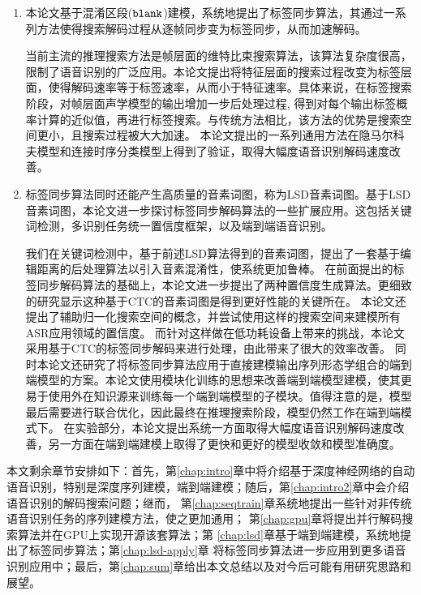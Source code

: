 \begin{enumerate}
\item 本论文基于混淆区段($\tt blank$)建模，系统地提出了标签同步算法，其通过一系列方法使得搜索解码过程从逐帧同步变为标签同步，从而加速解码。

当前主流的推理搜索方法是帧层面的维特比束搜索算法，该算法复杂度很高，限制了语音识别的广泛应用。本论文提出将特征层面的搜索过程改变为标签层面，使得解码速率等于标签速率，从而小于特征速率。具体来说，在标签搜索阶段，对帧层面声学模型的输出增加一步后处理过程, 得到对每个输出标签概率计算的近似值，再进行标签搜索。与传统方法相比，该方法的优势是搜索空间更小，且搜索过程被大大加速。
本论文提出的一系列通用方法在隐马尔科夫模型和连接时序分类模型上得到了验证，取得大幅度语音识别解码速度改善。

\item 标签同步算法同时还能产生高质量的音素词图，称为LSD音素词图。基于LSD音素词图，本论文进一步探讨标签同步解码算法的一些扩展应用。这包括关键词检测，多识别任务统一置信度框架，以及端到端语音识别。

我们在关键词检测中，基于前述LSD算法得到的音素词图，提出了一套基于编辑距离的后处理算法以引入音素混淆性，使系统更加鲁棒。
%
在前面提出的标签同步解码算法的基础上，本论文进一步提出了两种置信度生成算法。更细致的研究显示这种基于CTC的音素词图是得到更好性能的关键所在。
%
本论文还提出了辅助归一化搜索空间的概念，并尝试使用这样的搜索空间来建模所有ASR应用领域的置信度。 %
而针对这样做在低功耗设备上带来的挑战，本论文采用基于CTC的标签同步解码来进行处理，由此带来了很大的效率改善。
%
同时本论文还研究了将标签同步算法应用于直接建模输出序列形态学组合的端到端模型的方案。本论文使用模块化训练的思想来改善端到端模型建模，使其更易于使用外在知识源来训练每一个端到端模型的子模块。值得注意的是，模型最后需要进行联合优化，因此最终在推理搜索阶段，模型仍然工作在端到端模式下。
在实验部分，本论文提出系统一方面取得大幅度语音识别解码速度改善，另一方面在端到端建模上取得了更快和更好的模型收敛和模型准确度。

\end{enumerate}

本文剩余章节安排如下：首先，第\ref{chap:intro}章中将介绍基于深度神经网络的自动语音识别，特别是深度序列建模，端到端建模；随后，第\ref{chap:intro2}章中会介绍语音识别的解码搜索问题；继而，
第\ref{chap:seqtrain}章系统地提出一些针对非传统语音识别任务的序列建模方法，使之更加通用；
第\ref{chap:gpu}章将提出并行解码搜索算法并在GPU上实现开源该套算法；第
\ref{chap:lsd}章基于端到端建模，系统地提出了标签同步算法；第\ref{chap:lsd-apply}章
将标签同步算法进一步应用到更多语音识别应用中；最后，第\ref{chap:sum}章给出本文总结以及对今后可能有用研究思路和展望。
